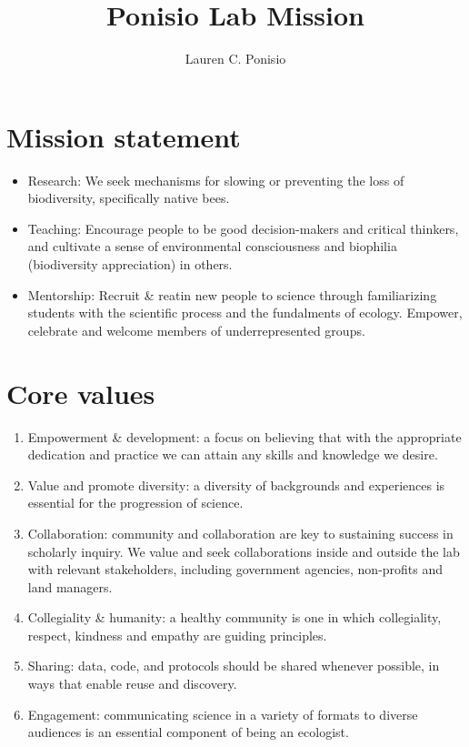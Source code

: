 \documentclass[12pt]{article}
\title{Ponisio Lab Mission}
\author{Lauren C. Ponisio}
\begin{document}
\maketitle

\section{Mission statement}
\begin{itemize}
\item Research: We seek mechanisms for slowing or preventing the loss
  of biodiversity, specifically native bees. 
\item Teaching: Encourage people to be good decision-makers
and critical thinkers, and cultivate a sense of environmental
consciousness and biophilia (biodiversity appreciation) in others.
\item Mentorship: Recruit \& reatin new people to
  science through familiarizing students with the scientific process
  and the fundalments of ecology. Empower, celebrate and welcome
  members of underrepresented groups.
\end{itemize}

\section{Core values}

\begin{enumerate}
\item Empowerment \& development: a focus on believing that with the
  appropriate dedication and practice we can attain any skills and
  knowledge we desire.
\item Value and promote diversity: a diversity of backgrounds and
  experiences is essential for the progression of science.
\item Collaboration: community and collaboration are key to sustaining
  success in scholarly inquiry. We value and seek collaborations
  inside and outside the lab with relevant stakeholders, including
  government agencies, non-profits and land managers.
\item Collegiality \& humanity: a healthy community is one in which
  collegiality, respect, kindness and empathy are guiding principles.
\item Sharing: data, code, and protocols should be shared whenever possible,
  in ways that enable reuse and discovery.
\item Engagement: communicating science in a variety of formats to
  diverse audiences is an essential component of being an ecologist.
\end{enumerate}
\end{document}
